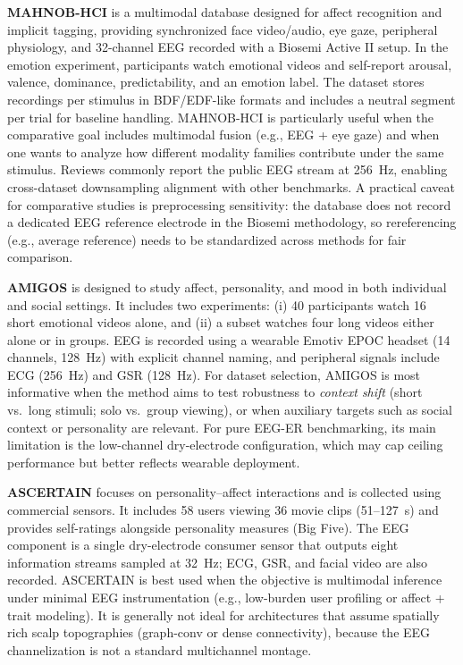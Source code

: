 \documentclass{WileyMSP-template}
\begin{document}
\textbf{MAHNOB-HCI}
 is a multimodal database designed for affect recognition and implicit tagging, providing synchronized face video/audio, eye gaze, peripheral physiology, and 32-channel EEG recorded with a Biosemi Active II setup. In the emotion experiment, participants watch emotional videos and self-report arousal, valence, dominance, predictability, and an emotion label. The dataset stores recordings per stimulus in BDF/EDF-like formats and includes a neutral segment per trial for baseline handling. \cite{soleymani2012mahnob}
MAHNOB-HCI is particularly useful when the comparative goal includes multimodal fusion (e.g., EEG + eye gaze) and when one wants to analyze how different modality families contribute under the same stimulus. Reviews commonly report the public EEG stream at 256~Hz, enabling cross-dataset downsampling alignment with other benchmarks. \cite{kukhilava2025evaluation}
A practical caveat for comparative studies is preprocessing sensitivity: the database does not record a dedicated EEG reference electrode in the Biosemi methodology, so rereferencing (e.g., average reference) needs to be standardized across methods for fair comparison. \cite{soleymani2012mahnob}

\textbf{AMIGOS}
 is designed to study affect, personality, and mood in both individual and social settings. It includes two experiments: (i) 40 participants watch 16 short emotional videos alone, and (ii) a subset watches four long videos either alone or in groups. EEG is recorded using a wearable Emotiv EPOC headset (14 channels, 128~Hz) with explicit channel naming, and peripheral signals include ECG (256~Hz) and GSR (128~Hz). \cite{amigos2018}
For dataset selection, AMIGOS is most informative when the method aims to test robustness to \emph{context shift} (short vs.\ long stimuli; solo vs.\ group viewing), or when auxiliary targets such as social context or personality are relevant. For pure EEG-ER benchmarking, its main limitation is the low-channel dry-electrode configuration, which may cap ceiling performance but better reflects wearable deployment. \cite{kukhilava2025evaluation,amigos2018}

\textbf{ASCERTAIN}
 focuses on personality--affect interactions and is collected using commercial sensors. It includes 58 users viewing 36 movie clips (51--127~s) and provides self-ratings alongside personality measures (Big Five). The EEG component is a single dry-electrode consumer sensor that outputs eight information streams sampled at 32~Hz; ECG, GSR, and facial video are also recorded. \cite{subramanian2018ascertain}
ASCERTAIN is best used when the objective is multimodal inference under minimal EEG instrumentation (e.g., low-burden user profiling or affect + trait modeling). It is generally not ideal for architectures that assume spatially rich scalp topographies (graph-conv or dense connectivity), because the EEG channelization is not a standard multichannel montage. \cite{li2022tutorial,subramanian2018ascertain}
\end{document}
